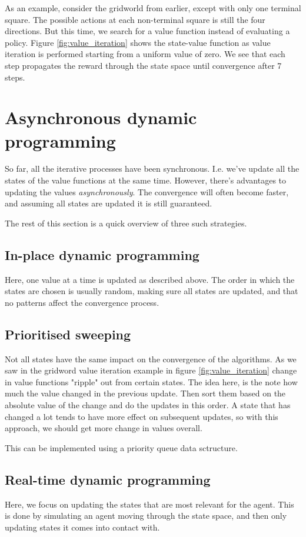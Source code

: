 \documentclass[12pt, a4paper]{article}
\numberwithin{equation}{section}
\begin{document}
As an example, consider the gridworld from earlier, except with only one terminal square. The possible actions at each non-terminal square is still the four directions. But this time, we search for a value function instead of evaluating a policy. Figure \ref{fig:value_iteration} shows the state-value function as value iteration is performed starting from a uniform value of zero. We see that each step propagates the reward through the state space until convergence after 7 steps.

\section{Asynchronous dynamic programming}
So far, all the iterative processes have been synchronous. I.e. we've update all the states of the value functions at the same time. However, there's advantages to updating the values \textit{asynchronously}. The convergence will often become faster, and assuming all states are updated it is still guaranteed.

The rest of this section is a quick overview of three such strategies.

\subsection{In-place dynamic programming}
Here, one value at a time is updated as described above. The order in which the states are chosen is usually random, making sure all states are updated, and that no patterns affect the convergence process.

\subsection{Prioritised sweeping}
Not all states have the same impact on the convergence of the algorithms. As we saw in the gridword value iteration example in figure \ref{fig:value_iteration} change in value functions "ripple" out from certain states. The idea here, is the note how much the value changed in the previous update. Then sort them based on the absolute value of the change and do the updates in this order. A state that has changed a lot tends to have more effect on subsequent updates, so with this approach, we should get more change in values overall.

This can be implemented using a priority queue data sctructure.

\subsection{Real-time dynamic programming}
Here, we focus on updating the states that are most relevant for the agent. This is done by simulating an agent moving through the state space, and then only updating states it comes into contact with.
\end{document}
